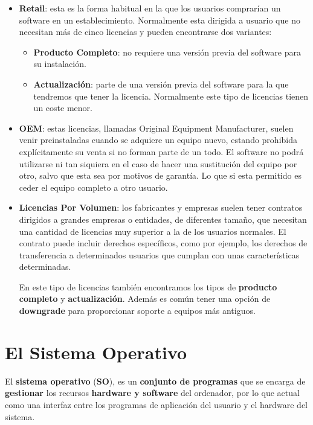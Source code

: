 \begin{itemize}
    \item \textbf{Retail}: esta es la forma habitual en la que los usuarios comprarían un software en un establecimiento. Normalmente esta dirigida a usuario que no necesitan más de cinco licencias y pueden encontrarse dos variantes:

    \begin{itemize}
        \item \textbf{Producto Completo}: no requiere una versión previa del software para su instalación.
        \item \textbf{Actualización}: parte de una versión previa del software para la que tendremos que tener la licencia. Normalmente este tipo de licencias tienen un coste menor.
    \end{itemize}

    \item \textbf{OEM}: estas licencias, llamadas Original Equipment Manufacturer, suelen venir preinstaladas cuando se adquiere un equipo nuevo, estando prohibida explícitamente su venta si no forman parte de un todo. El software no podrá utilizarse ni tan siquiera en el caso de hacer una sustitución del equipo por otro, salvo que esta sea por motivos de garantía. Lo que si esta permitido es ceder el equipo completo a otro usuario.

    \item \textbf{Licencias Por Volumen}: los fabricantes y empresas suelen tener contratos dirigidos a grandes empresas o entidades, de diferentes tamaño, que necesitan una cantidad de licencias muy superior a la de los usuarios normales. El contrato puede incluir derechos específicos, como por ejemplo, los derechos de transferencia a determinados usuarios que cumplan con unas características determinadas.

    En este tipo de licencias también encontramos los tipos de \textbf{producto completo} y \textbf{actualización}. Además es común tener una opción de \textbf{downgrade} para proporcionar soporte a equipos más antiguos.
\end{itemize}

\section{El Sistema Operativo}
El \textbf{sistema operativo} (\textbf{SO}), es un \textbf{conjunto de programas} que se encarga de \textbf{gestionar} los recursos \textbf{hardware y software} del ordenador, por lo que actual como una interfaz entre los programas de aplicación del usuario y el hardware del sistema.

